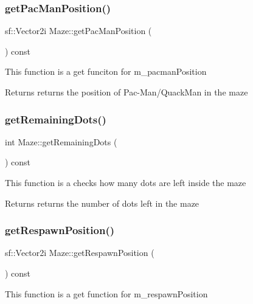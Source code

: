 \subsubsection{\texorpdfstring{get\+Pac\+Man\+Position()}{getPacManPosition()}}
{\footnotesize\ttfamily sf\+::\+Vector2i Maze\+::get\+Pac\+Man\+Position (\begin{DoxyParamCaption}{ }\end{DoxyParamCaption}) const}

This function is a get funciton for m\+\_\+pacman\+Position

\begin{DoxyReturn}{Returns}
returns the position of Pac-\/\+Man/\+Quack\+Man in the maze 
\end{DoxyReturn}
\mbox{\label{class_maze_afe0905b13aaefd6135346b3cda931556}} 
\subsubsection{\texorpdfstring{get\+Remaining\+Dots()}{getRemainingDots()}}
{\footnotesize\ttfamily int Maze\+::get\+Remaining\+Dots (\begin{DoxyParamCaption}{ }\end{DoxyParamCaption}) const}

This function is a checks how many dots are left inside the maze

\begin{DoxyReturn}{Returns}
returns the number of dots left in the maze 
\end{DoxyReturn}
\mbox{\label{class_maze_a245890f620b8d7ac3445fd4ca0d090e1}} 
\subsubsection{\texorpdfstring{get\+Respawn\+Position()}{getRespawnPosition()}}
{\footnotesize\ttfamily sf\+::\+Vector2i Maze\+::get\+Respawn\+Position (\begin{DoxyParamCaption}{ }\end{DoxyParamCaption}) const}

This function is a get function for m\+\_\+respawn\+Position


